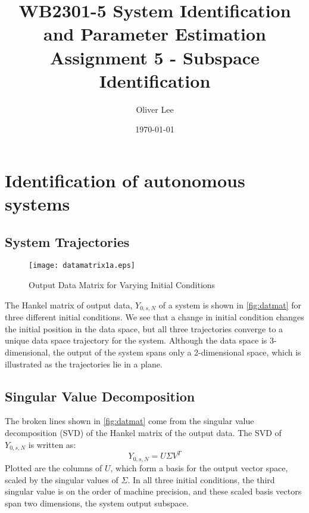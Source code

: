 \documentclass[11pt,a4paper]{article}
\title{WB2301-5 System Identification and Parameter Estimation \\
Assignment 5 - Subspace Identification}
\author{Oliver Lee}
\date{\today}
\begin{document}
\maketitle

\section{Identification of autonomous systems}

\subsection{System Trajectories}
\begin{figure}
    \centering
    \texttt{[image: datamatrix1a.eps]}
    \caption{Output Data Matrix for Varying Initial Conditions}
    \label{fig:datmat}
\end{figure}
The Hankel matrix of output data, $Y_{0,s,N}$ of a system is shown in
\autoref{fig:datmat} for three different initial conditions. We see that a
change in initial condition changes the initial position in the data space, but
all three trajectories converge to a unique data space trajectory for the
system.  Although the data space is 3-dimensional, the output of the system
spans only a 2-dimensional space, which is illustrated as the trajectories lie
in a plane.

\subsection{Singular Value Decomposition}
The broken lines shown in \autoref{fig:datmat} come from the singular value
decomposition (SVD) of the Hankel matrix of the output data. The SVD of
$Y_{0, s, N}$ is written as:
\begin{equation}
    \label{eq:svd}
    Y_{0, s, N} = U \Sigma V^T
\end{equation}
Plotted are the columns of $U$, which form a basis for the output vector space,
scaled by the singular values of $\Sigma$. In all three initial conditions, the
third singular value is on the order of machine precision, and these scaled
basis vectors span two dimensions, the system output subspace.

\end{document}
